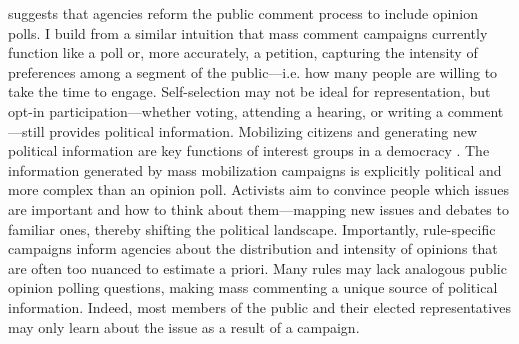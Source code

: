 \citet{Rauch2016} suggests that agencies reform the public comment process to include opinion polls. I build from a similar intuition that mass comment campaigns currently function like a poll or, more accurately, a petition, capturing the intensity of preferences among a segment of the public---i.e. how many people are willing to take the time to engage. Self-selection may not be ideal for representation, but opt-in participation---whether voting, attending a hearing, or writing a comment---still provides political information. 
Mobilizing citizens and generating new political information are key functions of interest groups in a democracy \citep{Mansbridge1992, Mahoney2007}. The information generated by mass mobilization campaigns is explicitly political and more complex than an opinion poll. Activists aim to convince people which issues are important and how to think about them---mapping new issues and debates to familiar ones, thereby shifting the political landscape. Importantly, rule-specific campaigns inform agencies about the distribution and intensity of opinions that are often too nuanced to estimate a priori. Many rules may lack analogous public opinion polling questions, making mass commenting a unique source of political information. Indeed, most members of the public and their elected representatives may only learn about the issue as a result of a campaign.















